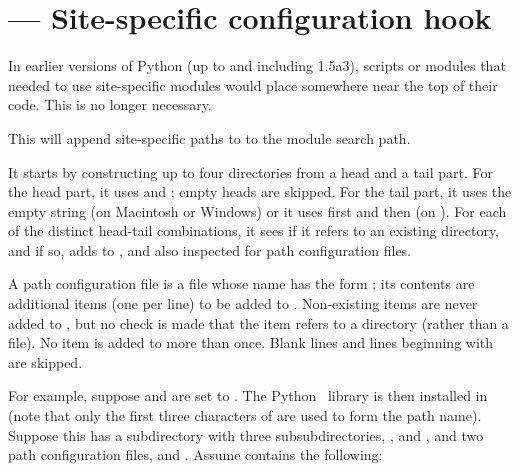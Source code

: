\section{ ---
         Site-specific configuration hook}




In earlier versions of Python (up to and including 1.5a3), scripts or
modules that needed to use site-specific modules would place
 somewhere near the top of their code.  This is no
longer necessary.

This will append site-specific paths to to the module search path.

It starts by constructing up to four directories from a head and a
tail part.  For the head part, it uses  and
; empty heads are skipped.  For
the tail part, it uses the empty string (on Macintosh or Windows) or
it uses first  and then
 (on \UNIX{}).  For each of the distinct
head-tail combinations, it sees if it refers to an existing directory,
and if so, adds to , and also inspected for path
configuration files.

A path configuration file is a file whose name has the form
; its contents are additional items (one
per line) to be added to .  Non-existing items are
never added to , but no check is made that the item
refers to a directory (rather than a file).  No item is added to
 more than once.  Blank lines and lines beginning with
\code{\#} are skipped.

For example, suppose  and  are
set to .  The Python \version\ library is then
installed in  (note that only the first 
three characters of  are used to form the path
name).  Suppose this has a subdirectory
 with three
subsubdirectories, ,  and , and two
path configuration files,  and .  Assume
 contains the following:

